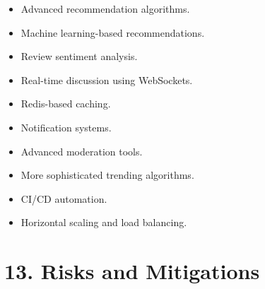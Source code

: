 \documentclass[11pt,a4paper]{article}
\begin{document}
\begin{itemize}

    \item Advanced recommendation algorithms.

    \item Machine learning-based recommendations.

    \item Review sentiment analysis.

    \item Real-time discussion using WebSockets.

    \item Redis-based caching.

    \item Notification systems.

    \item Advanced moderation tools.

    \item More sophisticated trending algorithms.

    \item CI/CD automation.

    \item Horizontal scaling and load balancing.

\end{itemize}



\section{13. Risks and Mitigations}
\end{document}
